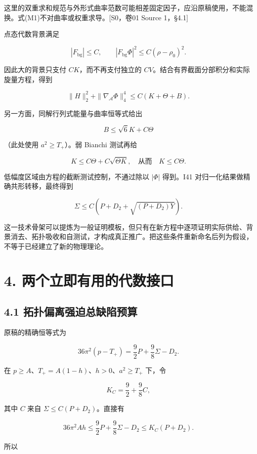 \documentclass[UTF8,a4paper,11pt,fontset=fandol]{ctexart}
\begin{document}
这里的双重求和规范与外形式曲率范数可能相差固定因子，应沿原稿使用，不能混换。式(M1)不对曲率或权重求导。{[}S0，卷01
Source 1，§4.1{]}

点态代数背景满足

\[
|F_{\mathrm{bg}}|\le C,\qquad
|F_{\mathrm{bg}}\Phi|^2\le C(\rho-\rho_0)^2.
\]

因此大的背景只支付 \(CK\)，而不再支付独立的
\(CV\)。结合有界截面分部积分和实际旋量方程，得到

\[
\|H\|_2^2+\|\nabla_{\mathcal A}\Phi\|_4^4
\le C(K+\Theta+B).
\tag{M2}
\]

另一方面，同解行列式能量与曲率恒等式给出

\[
B\le\sqrt6K+C\Theta
\tag{M3}
\]

（此处使用 \(a^2\ge T_+\)）。弱 Bianchi 测试再给

\[
K\le C\Theta+C\sqrt{\Theta K},
\quad\text{从而}\quad K\le C\Theta.
\tag{M4}
\]

低幅度区域由方程的截断测试控制，不通过除以 \(|\Phi|\) 得到。I41
对归一化结果做精确共形转移，最终得到

\[
\Sigma\le C\left(P+D_2+\sqrt{(P+D_2)Y}\right).
\tag{M5}
\]

这一技术骨架可以提炼为一般证明模板，但只有在新方程中逐项证明实际供给、背景消去、拓扑吸收和自测试，才构成真正推广。把这些条件重新命名后列为假设，不等于已经建立了新的物理理论。

\section{4.
两个立即有用的代数接口}\label{ux4e24ux4e2aux7acbux5373ux6709ux7528ux7684ux4ee3ux6570ux63a5ux53e3}

\subsection{4.1
拓扑偏离强迫总缺陷预算}\label{ux62d3ux6251ux504fux79bbux5f3aux8febux603bux7f3aux9677ux9884ux7b97}

原稿的精确恒等式为

\[
36\pi^2(p-T_+)=\frac92P+\frac98\Sigma-D_2.
\tag{M6}
\]

在 \(p\ge A\)、\(T_+=A(1-h)\)、\(h>0\)、\(a^2\ge T_+\) 下，令

\[
K_C=\frac92+\frac98C,
\]

其中 \(C\) 来自 \(\Sigma\le C(P+D_2)\)。直接有

\[
36\pi^2Ah\le\frac92P+\frac98\Sigma-D_2
\le K_C(P+D_2).
\]

所以
\end{document}
